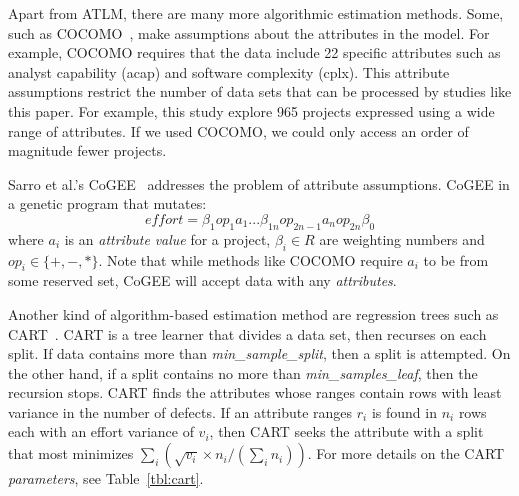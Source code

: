 \documentclass[10pt,conference]{IEEEtran}
\begin{document}
Apart from ATLM, there are many more algorithmic estimation methods. Some, such as COCOMO~\cite{boehm1981software}, make assumptions
about the  attributes in the model. For example, COCOMO requires that the
data include 22 specific   attributes such as analyst capability (acap) and software complexity (cplx).  This   attribute
assumptions restrict the number
of data sets that can be processed by studies like this paper. For example,
this study explore 965 projects expressed using a  wide range of  attributes.  If we used COCOMO, we could only access an order of magnitude   fewer projects.

Sarro et al.'s CoGEE~\cite{sarro2016multi} addresses
the problem of  attribute assumptions. CoGEE in a genetic program
that mutates: \[\mathit{effort} = \beta_1 \mathit{op}_1 a_1  ... \beta_{1n} \mathit{op}_{2n-1} a_n  \mathit{op}_{2n} \beta_0\]
where $a_i$ is an {\em attribute} {\em value} for a project,  $\beta_i \in R$ are weighting numbers and
\mbox{$\mathit{op_i}\in \{+,-,*\}$}. Note that while methods like COCOMO require $a_i$ to be from some reserved set, 
CoGEE will accept data with any {\em attributes}.




Another kind of algorithm-based estimation method are regression trees such as   CART~\cite{brieman84}.  
CART is a  tree learner that divides a data set, then recurses
on each split.
If data contains more than {\em min\_sample\_split}, then a split is attempted.
On the other hand, if a split contains no more than {\em min\_samples\_leaf}, then the recursion stops. 
CART finds the attributes whose ranges contain rows with least variance in the number
of defects. If an  attribute ranges $r_i$ is found in 
$n_i$ rows each with an effort  variance of $v_i$, then CART seeks the  attribute with a split that most
minimizes $\sum_i \left(\sqrt{v_i}\times n_i/(\sum_i n_i)\right)$.
For more details on the CART {\em parameters}, see Table~\ref{tbl:cart}.





 
\end{document}
